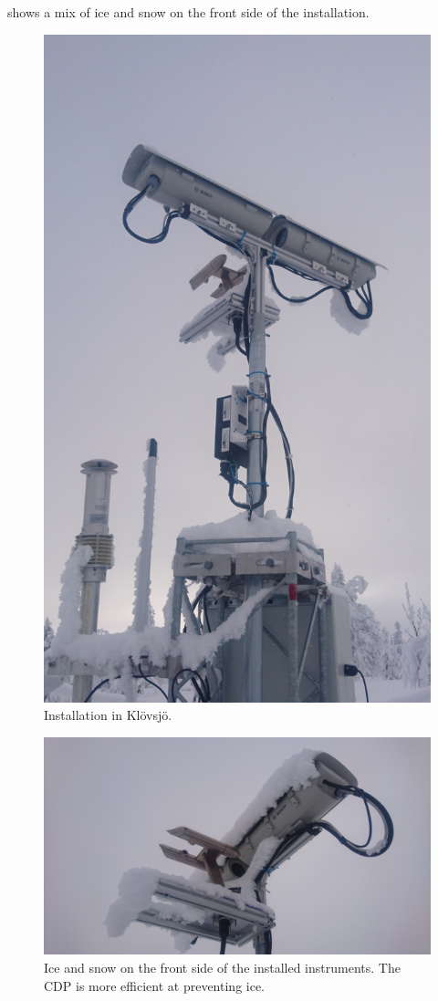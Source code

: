  shows a mix of ice and snow on the front side of the installation.

\begin{figure}[ht]
\centering\includegraphics[width=0.75\linewidth]{figures/installation1}
\caption{Installation in Klövsjö.}
\label{fig:installation1}
\end{figure}

\begin{figure}[ht]
\centering\includegraphics[width=0.75\linewidth]{figures/installation3}
\caption{Ice and snow on the front side of the installed instruments. The CDP is more efficient at preventing ice.}
\label{fig:installation3}
\end{figure}

